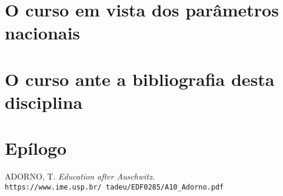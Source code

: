 \documentclass[12pt,a4paper]{article}
\begin{document}
	
	\newpage
		
	\section{O curso em vista dos parâmetros nacionais}
	
    
	
	\newpage
	
	\section{O curso ante a bibliografia desta disciplina}
	

	
	
	\newpage
	
	\section{Epílogo}
	
    
	
	\newpage
	

	
	\newpage
	
	\begin{thebibliography}{9}
		ADORNO, T. 
		\textit{Education after Auschwitz. }   
		\\\texttt{https://www.ime.usp.br/~tadeu/EDF0285/A10\_Adorno.pdf}
		
		
	\end{thebibliography}
\end{document}
